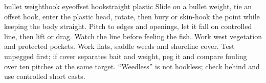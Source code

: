 
{{bullet weight}{hook eye}{offset hook}{straight plastic}}
{Slide on a bullet weight, tie an offset hook, enter the plastic head, rotate,
then bury or skin-hook the point while keeping the body straight.}
{Pitch to edges and openings, let it fall on controlled line, then lift or
drag. Watch the line before feeling the fish.}
{Work west vegetation and protected pockets.}
{Work flats, saddle weeds and shoreline cover.}
{Test unpegged first; if cover separates bait and weight, peg it and compare
fouling over ten pitches at the same target.}
{“Weedless” is not hookless; check behind and use controlled short casts.}
